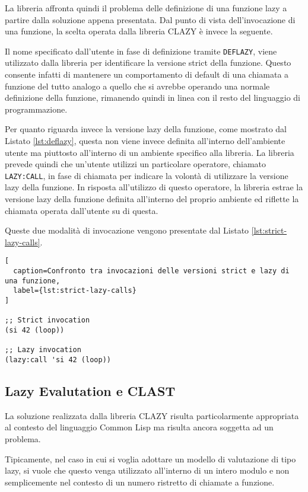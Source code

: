La libreria affronta quindi il problema delle definizione di una funzione lazy a
partire dalla soluzione appena presentata. Dal punto di vista dell'invocazione
di una funzione, la scelta operata dalla libreria CLAZY è invece la seguente.

Il nome specificato dall'utente in fase di definizione tramite \texttt{DEFLAZY},
viene utilizzato dalla libreria per identificare la versione strict della
funzione. Questo consente infatti di mantenere un comportamento di default di
una chiamata a funzione del tutto analogo a quello che si avrebbe operando una
normale definizione della funzione, rimanendo quindi in linea con il resto del
linguaggio di programmazione.

Per quanto riguarda invece la versione lazy della funzione, come mostrato dal
Listato \ref{lst:deflazy}, questa non viene invece definita all'interno
dell'ambiente utente ma piuttosto all'interno di un ambiente specifico alla
libreria. La libreria prevede quindi che un'utente utilizzi un particolare
operatore, chiamato \texttt{LAZY:CALL}, in fase di chiamata per indicare la
volontà di utilizzare la versione lazy della funzione. In risposta all'utilizzo
di questo operatore, la libreria estrae la versione lazy della funzione definita
all'interno del proprio ambiente ed riflette la chiamata operata dall'utente su
di questa.

Queste due modalità di invocazione vengono presentate dal Listato
\ref{lst:strict-lazy-calls}.

\begin{lstlisting}[
  caption=Confronto tra invocazioni delle versioni strict e lazy di una funzione,
  label={lst:strict-lazy-calls}
]

;; Strict invocation
(si 42 (loop))

;; Lazy invocation
(lazy:call 'si 42 (loop))

\end{lstlisting}

\subsection{Lazy Evalutation e CLAST}

La soluzione realizzata dalla libreria CLAZY risulta particolarmente appropriata
al contesto del linguaggio Common Lisp ma risulta ancora soggetta ad un
problema.

Tipicamente, nel caso in cui si voglia adottare un modello di valutazione di
tipo lazy, si vuole che questo venga utilizzato all'interno di un intero modulo
e non semplicemente nel contesto di un numero ristretto di chiamate a funzione.

